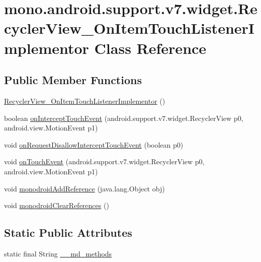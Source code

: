 \hypertarget{classmono_1_1android_1_1support_1_1v7_1_1widget_1_1_recycler_view___on_item_touch_listener_implementor}{
\section{mono.android.support.v7.widget.RecyclerView\_\-OnItemTouchListenerImplementor Class Reference}
\label{classmono_1_1android_1_1support_1_1v7_1_1widget_1_1_recycler_view___on_item_touch_listener_implementor}
}
\subsection*{Public Member Functions}
\begin{CompactItemize}
\item 
\hyperlink{classmono_1_1android_1_1support_1_1v7_1_1widget_1_1_recycler_view___on_item_touch_listener_implementor_afc05230fa3a1f04fdc998c5f6ac2429}{RecyclerView\_\-OnItemTouchListenerImplementor} ()
\item 
boolean \hyperlink{classmono_1_1android_1_1support_1_1v7_1_1widget_1_1_recycler_view___on_item_touch_listener_implementor_8a0736f0a9d7a6f76bda7054dcb41dba}{onInterceptTouchEvent} (android.support.v7.widget.RecyclerView p0, android.view.MotionEvent p1)
\item 
void \hyperlink{classmono_1_1android_1_1support_1_1v7_1_1widget_1_1_recycler_view___on_item_touch_listener_implementor_4f354b716f02d9a0503d7758eee6bacc}{onRequestDisallowInterceptTouchEvent} (boolean p0)
\item 
void \hyperlink{classmono_1_1android_1_1support_1_1v7_1_1widget_1_1_recycler_view___on_item_touch_listener_implementor_5cad879ac69bfe24f07d5206df2d735c}{onTouchEvent} (android.support.v7.widget.RecyclerView p0, android.view.MotionEvent p1)
\item 
void \hyperlink{classmono_1_1android_1_1support_1_1v7_1_1widget_1_1_recycler_view___on_item_touch_listener_implementor_cf33c28d463b81a7c5869ff7e88194de}{monodroidAddReference} (java.lang.Object obj)
\item 
void \hyperlink{classmono_1_1android_1_1support_1_1v7_1_1widget_1_1_recycler_view___on_item_touch_listener_implementor_c6775e7a24e7759275a4bcc438d89cce}{monodroidClearReferences} ()
\end{CompactItemize}
\subsection*{Static Public Attributes}
\begin{CompactItemize}
\item 
static final String \hyperlink{classmono_1_1android_1_1support_1_1v7_1_1widget_1_1_recycler_view___on_item_touch_listener_implementor_f3805010ccf5976fd0ef488ea4cc6ae7}{\_\-\_\-md\_\-methods}
\end{CompactItemize}
